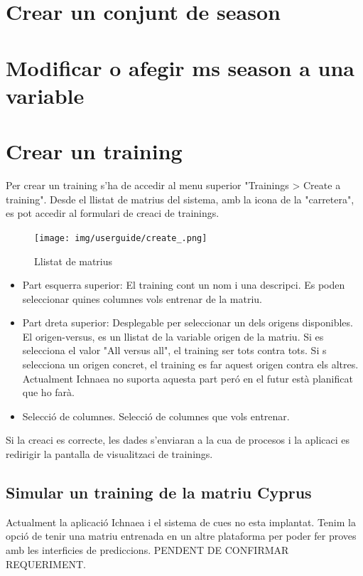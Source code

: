 \section{Crear un conjunt de season}

\section{Modificar o afegir ms season a una variable}

\section{Crear un training}
Per crear un training s'ha de accedir al menu superior "Trainings > Create a training". Desde el llistat de matrius del sistema, amb la icona de la "carretera", es pot accedir al formulari de creaci de trainings.
\begin{figure}[h!]
  \centering
  \texttt{[image: img/userguide/create\_.png]}
  \caption{Llistat de matrius}
  \label{fig:placement}
\end{figure}
\begin{itemize}
\item Part esquerra superior: El training cont un nom i una descripci. Es poden seleccionar quines columnes vols entrenar de la matriu. 
\item Part dreta superior: Desplegable per seleccionar un dels origens disponibles.  El origen-versus, es un llistat de la variable origen de la matriu. Si es selecciona el valor "All versus all", el training ser tots contra tots. Si s selecciona un origen concret, el training es far aquest origen contra els altres. Actualment Ichnaea no suporta aquesta part per\'{o} en el futur est\`{a} planificat que ho far\`{a}.
\item Selecci\'{o} de columnes. Selecci\'{o} de columnes que vols entrenar.
\end{itemize}

Si la creaci \´e{s} correcte, les dades s'enviaran a la cua de procesos i la aplicaci es redirigir la pantalla de visualitzaci de trainings.

\subsection{Simular un training de la matriu Cyprus}
Actualment la aplicaci\'{o} Ichnaea i el sistema de cues no esta implantat. Tenim la opci\'{o} de tenir una matriu entrenada en un altre plataforma per poder fer proves amb les interficies de prediccions. PENDENT DE CONFIRMAR REQUERIMENT.

